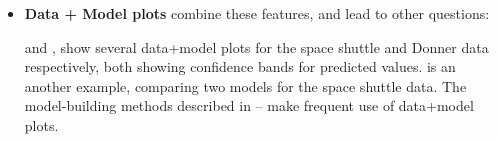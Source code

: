 \begin{itemize}
    \item \textbf{Data + Model plots} combine these features, and lead to other questions:

     and  , 
    show several data+model plots for the space shuttle and Donner data respectively,
    both showing confidence bands for predicted values.
     is an another example, comparing two models for the space shuttle data.
    The model-building methods described in -- make frequent
    use of data+model plots.
\end{itemize}